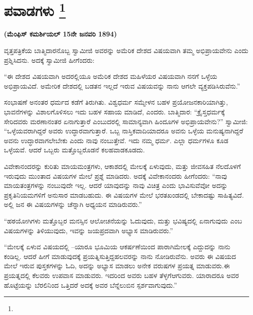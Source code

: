 
\chapter[ಪವಾಡಗಳು ]{ಪವಾಡಗಳು \protect\footnote{}}

\centerline{\textbf{(ಮೆಂಫಿಸ್​ ಕಮರ್ಶಿಯಲ್​ 15ನೇ ಜನವರಿ 1894)}}

\vskip 4pt

ವೃತ್ತಪತ್ರಿಕೆಯ ಬಾತ್ಮಿದಾರನೊಬ್ಬ ಸ್ವಾಮೀಜಿ ಅವರನ್ನು ಅಮೆರಿಕ ದೇಶದ ವಿಷಯವಾಗಿ ತಮ್ಮ ಅಭಿಪ್ರಾಯವೇನು ಎಂದು ಪ್ರಶ್ನಿಸಿದನು. ಅದಕ್ಕೆ ಸ್ವಾಮೀಜಿ ಹೀಗೆಂದರು:

\vskip 3pt

“ಈ ದೇಶದ ವಿಷಯವಾಗಿ ಅದರಲ್ಲಿಯೂ ಅಮೆರಿಕ ದೇಶದ ಮಹಿಳೆಯರ ವಿಷಯವಾಗಿ ನನಗೆ ಒಳ್ಳೆಯ ಅಭಿಪ್ರಾಯವಿದೆ. ಅಮೇರಿಕ ದೇಶದಲ್ಲಿ ಬಡತನ ಇಲ್ಲದೆ ಇರುವ ವಿಷಯವನ್ನು ನಾನು ಆಗಲೇ ವ್ಯಕ್ತಪಡಿಸಿರುವೆನು.”

\vskip 3pt

ಸಂಭಾಷಣೆ ಅನಂತರ ಧರ್ಮದ ಕಡೆಗೆ ತಿರುಗಿತು. ವಿಶ್ವಧರ್ಮ ಸಮ್ಮೇಳನ ಬಹಳ ಪ್ರಯೋಜನಕಾರಿಯಾಗಿತ್ತು, ಭಾವನೆಗಳನ್ನು ವಿಶಾಲಗೊಳಿಸಲು ಇದು ಬಹಳ ಸಹಾಯ ಮಾಡಿದೆ, ಎಂದರು. ಬಾತ್ಮಿದಾರ: “ಕ್ರೈಸ್ತಧರ್ಮಕ್ಕೆ ಸೇರಿದವರು ಮರಣಾನಂತರ ಏನಾಗುತ್ತಾರೆ ಎಂಬುದರಲ್ಲಿ ಸಾಮಾನ್ಯವಾಗಿ ಹಿಂದೂಗಳ ಅಭಿಪ್ರಾಯವೇನು?” ಸ್ವಾಮೀಜಿ: “ಒಳ್ಳೆಯವರಾಗಿದ್ದರೆ ಅವರು ಉದ್ಧಾರವಾಗುತ್ತಾರೆ. ಒಬ್ಬ ನಾಸ್ತಿಕವಾದಿಯಾದರೂ ಅವನು ಒಳ್ಳೆಯ ಮನುಷ್ಯನಾಗಿದ್ದರೆ ಅವನು ಉದ್ಧಾರವಾಗಲೇಬೇಕು ಎಂದು ನಾವು ನಂಬುತ್ತೇವೆ. ಇದು ನಮ್ಮ ಧರ್ಮ. ಎಲ್ಲಾ ಧರ್ಮಗಳೂ ಕೂಡ ಒಳ್ಳೆಯವೆ. ಆದರೆ ಒಬ್ಬರು ಮತ್ತೊಬ್ಬರೊಡನೆ ಕಲಹವಾಡಕೂಡದು.

\vskip 3pt

ವಿವೇಕಾನಂದರನ್ನು ಕುರಿತು ಮಾಯಮಂತ್ರಗಳು, ಆಕಾಶದಲ್ಲಿ ಮೇಲಕ್ಕೆ ಏಳುವುದು, ಮತ್ತು ಜೀವಸಹಿತ ನೆಲದೊಳಗೆ ಇರುವುದು ಮುಂತಾದ ವಿಷಯಗಳ ಮೇಲೆ ಪ್ರಶ್ನೆ ಮಾಡಿದರು. ಅದಕ್ಕೆ ವಿವೇಕಾನಂದರು ಹೀಗೆಂದರು: “ನಾವು ಮಾಯತಂತ್ರಗಳನ್ನು ನಂಬುವುದೇ ಇಲ್ಲ. ಆದರೆ ಯಾವುದನ್ನು ನಾವು ವಿಚಿತ್ರ ಎಂದು ಭಾವಿಸುವೆವೋ ಅದನ್ನು ಪ್ರಕೃತಿನಿಯಮಗಳಿಗೆ ಅನುಸಾರ ಮಾಡಬಹುದು. ಈ ವಿಷಯಗಳ ಮೇಲೆ ಭರತಖಂಡದಲ್ಲಿ ಬೇಕಾದಷ್ಟು ಸಾಹಿತ್ಯವಿದೆ. ಅಲ್ಲಿ ಜನ ಈ ವಿಷಯಗಳನ್ನು ಚೆನ್ನಾಗಿ ಅಧ್ಯಯನ ಮಾಡಿರುವರು.”

\vskip 5pt

“ಹಠಯೋಗಿಗಳು ಮತ್ತೊಬ್ಬರ ಮನಸ್ಸಿನ ಆಲೋಚನೆಯನ್ನು ಓದುವುದು, ಮತ್ತು ಭವಿಷ್ಯದಲ್ಲಿ ಏನಾಗುವುದು ಎಂಬ ವಿಷಯಗಳನ್ನು ತಿಳಿಯುವುದು, ಇವನ್ನು ಜಯಪ್ರದವಾಗಿ ಅಭ್ಯಾಸ ಮಾಡಿರುವರು.”

\vskip 5pt

“ಮೇಲಕ್ಕೆ ಏಳುವ ವಿಷಯದಲ್ಲಿ –ಯಾರೂ ಭೂಮಿಯ ಆಕರ್ಷಣೆಯಿಂದ ಪಾರಾಗಿ\break ಮೇಲಕ್ಕೆ ಎದ್ದುದನ್ನು ನಾನು ಕಂಡಿಲ್ಲ. ಆದರೆ ಹೀಗೆ ಮಾಡುವುದಕ್ಕೆ ಪ್ರಯತ್ನಿಸುತ್ತಿದ್ದ\break ಹಲವರನ್ನು ನಾನು ನೋಡಿರುವೆನು. ಅವರು ಈ ವಿಷಯದ ಮೇಲೆ ಇರುವ ಪುಸ್ತಕಗಳನ್ನು ಓದಿ, ಅದನ್ನು ಅಭ್ಯಾಸ ಮಾಡಲು ಅನೇಕ ವರುಷಗಳ ಪ್ರಯತ್ನ ಮಾಡುವರು.\break ಈ ಪ್ರಯತ್ನದಲ್ಲಿ ಕೆಲವರು ಉಪವಾಸ ಮಾಡುವರು. ಇದರಿಂದ ಅವರು ಬಹಳ ತೆಳ್ಳಗೆ\break ಆಗುವರು. ಯಾರಾದರೂ ಅವರ ಹೊಟ್ಟೆಯನ್ನು ಬೆರಲಿನಿಂದ ಒತ್ತಿದರೆ ಅದಕ್ಕೆ ಅವರ ಬೆನ್ನೆಲುಬಿನ ಸ್ಪರ್ಶವಾಗುವುದು.”

